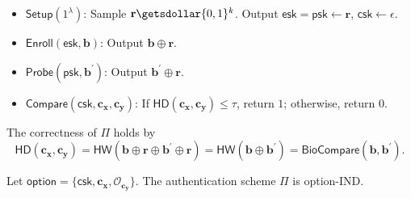 \begin{itemize}

	\item $\mathsf{Setup} (1^\lambda)$: Sample $\mathbf{r} \getsdollar \{0, 1\}^k$. Output $\mathsf{esk} = \mathsf{psk} \gets \mathbf{r}$, $\mathsf{csk} \gets \epsilon$.

	\item $\mathsf{Enroll}(\mathsf{esk}, \mathbf{b})$: Output $\mathbf{b} \oplus \mathbf{r}$.
	
	\item $\mathsf{Probe}(\mathsf{psk}, \mathbf{b}^\prime)$: Output $\mathbf{b}^\prime \oplus \mathbf{r}$.

	\item $\mathsf{Compare} (\mathsf{csk}, \mathbf{c_x}, \mathbf{c_y})$: If $\mathsf{HD}(\mathbf{c_x}, \mathbf{c_y}) \leq \tau$, return $1$; otherwise, return $0$. 

\end{itemize}
The correctness of $\Pi$ holds by
\[
	\textsf{HD}(\mathbf{c_x}, \mathbf{c_y}) = \textsf{HW}(\mathbf{b} \oplus \mathbf{r} \oplus \mathbf{b}^\prime \oplus \mathbf{r}) = \textsf{HW}(\mathbf{b} \oplus \mathbf{b}^\prime) = \textsf{BioCompare}(\mathbf{b}, \mathbf{b}^\prime).
\]

\begin{theorem}
\label{thm:rh:ind:particular-biometri-layer}
Let $\mathsf{option} = \{\mathsf{csk}, \mathbf{c_x}, \mathcal{O}_{\mathbf{c_y}}\}$. The authentication scheme $\Pi$ is \textsf{option}-IND.

\end{theorem}

